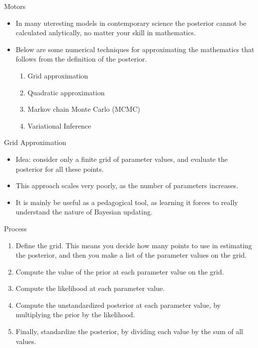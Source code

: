 \documentclass[handout]{beamer}
\begin{document}
\begin{frame}{Motors}
\scriptsize{

\begin{itemize}
\item In many uteresting models in contemporary science the posterior cannot be calculated anlytically, no matter your
skill in mathematics.

\item Below are some numerical techniques for approximating the mathematics that follows from the definition of the posterior.

\begin{enumerate}
 \item Grid approximation
 \item Quadratic approximation
 \item Markov chain Monte Carlo (MCMC)
 \item Variational Inference
\end{enumerate}

\end{itemize}



} 
\end{frame}



\begin{frame}{Grid Approximation}
\scriptsize{

\begin{itemize}

\item Idea: consider only a finite grid of parameter values, and evaluate the posterior for all these points.


\item This approach scales very poorly, as the number of parameters increases.


\item It is mainly be useful as a pedagogical tool, as learning it forces to really understand the nature of Bayesian updating.


\end{itemize}

\begin{block}{Process}
\begin{enumerate}

  \item Define the grid. This means you decide how many points to use in estimating the posterior, and then you make a list of the parameter values on the grid.
\item Compute the value of the prior at each parameter value on the grid.
\item Compute the likelihood at each parameter value.
\item Compute the unstandardized posterior at each parameter value, by multiplying the prior by the likelihood.
\item  Finally, standardize the posterior, by dividing each value by the sum of all values.
\end{enumerate}
\end{block}

} 


\end{frame}
\end{document}
